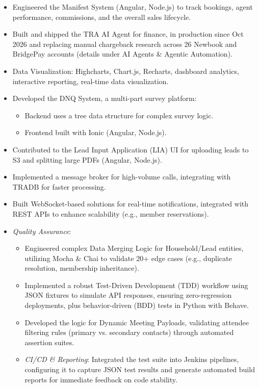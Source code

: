 \documentclass{res} %
\begin{document}
\begin{resume}
\begin{itemize}
    \item Engineered the Manifest System (Angular, Node.js) to track bookings, agent performance, commissions, and the overall sales lifecycle.
    \item Built and shipped the TRA AI Agent for finance, in production since Oct 2026 and replacing manual chargeback research across 26 Newbook and BridgePay accounts (details under AI Agents \& Agentic Automation).
    \item Data Visualization: Highcharts, Chart.js, Recharts, dashboard analytics, interactive reporting, real-time data visualization.
    \item Developed the DNQ System, a multi-part survey platform:
      \begin{itemize}
        \item Backend uses a tree data structure for complex survey logic.
        \item Frontend built with Ionic (Angular, Node.js).
      \end{itemize}
    \item Contributed to the Lead Input Application (LIA) UI for uploading leads to S3 and splitting large PDFs (Angular, Node.js).
    \item Implemented a message broker for high-volume calls, integrating with TRADB for faster processing.
    \item Built WebSocket-based solutions for real-time notifications, integrated with REST APIs to enhance scalability (e.g., member reservations). \smallskip
    \item \emph{Quality Assurance}:
      \begin{itemize}
        \item Engineered complex Data Merging Logic for Household/Lead entities, utilizing Mocha \& Chai to validate 20+ edge cases (e.g., duplicate resolution, membership inheritance).
        \item Implemented a robust Test-Driven Development (TDD) workflow using JSON fixtures to simulate API responses, ensuring zero-regression deployments, plus behavior-driven (BDD) tests in Python with Behave.
        \item Developed the logic for Dynamic Meeting Payloads, validating attendee filtering rules (primary vs. secondary contacts) through automated assertion suites.
        \item \emph{CI/CD \& Reporting}: Integrated the test suite into Jenkins pipelines, configuring it to capture JSON test results and generate automated build reports for immediate feedback on code stability.

\end{itemize}
\end{itemize}
\end{resume}
\end{document}

